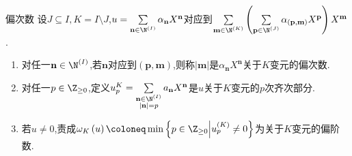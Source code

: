 \begin{definition}{偏次数}{}
	设$J\subseteq I,K=I\setminus J$,$u=\sum\limits_{\mathbf{n}\in\N^{\left(I\right)}}\alpha_{\mathbf{n}}X^{\mathbf{n}}$对应到$\sum\limits_{\mathbf{m}\in\N^{\left(K\right)}}\left(\sum\limits_{\mathbf{p}\in\N^{\left(J\right)}}\alpha_{\left(\mathbf{p},\mathbf{m}\right)}X^{\mathbf{p}}\right)X^{\mathbf{m}}$.
	\begin{enumerate}
		\item 对任一$\mathbf{n}\in\N^{\left(I\right)}$,若$\mathbf{n}$对应到$\left(\mathbf{p},\mathbf{m}\right)$,则称$\left|\mathbf{m}\right|$是$\alpha_{\mathbf{n}}X^{\mathbf{n}}$关于$K$变元的偏次数.
		\item 对任一$p\in\Z_{\geq 0}$,定义$u_{p}^{K}=\sum\limits_{\substack{\mathbf{n}\in\N^{\left(I\right)}\\ \left|\mathbf{n}\right|=p}}a_{\mathbf{n}}X^{\mathbf{n}}$是$u$关于$K$变元的$p$次齐次部分.
		\item 若$u\neq 0$,责成$\omega_{K}\left(u\right)\coloneq\min\left\{p\in\Z_{\geq 0}\middle|u_{p}^{\left(K\right)}\neq 0\right\}$为关于$K$变元的偏阶数.
	\end{enumerate}
\end{definition}

